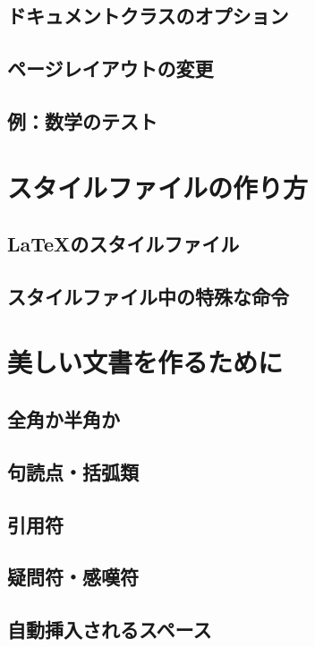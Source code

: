 \documentclass{jsbook}
\begin{document}
\section{ドキュメントクラスのオプション}

\section{ページレイアウトの変更}

\section{例：数学のテスト}

\chapter{スタイルファイルの作り方}

\section{\LaTeX のスタイルファイル}

\section{スタイルファイル中の特殊な命令}

\chapter{美しい文書を作るために}

\section{全角か半角か}

\section{句読点・括弧類}

\section{引用符}

\section{疑問符・感嘆符}

\section{自動挿入されるスペース}
\end{document}
